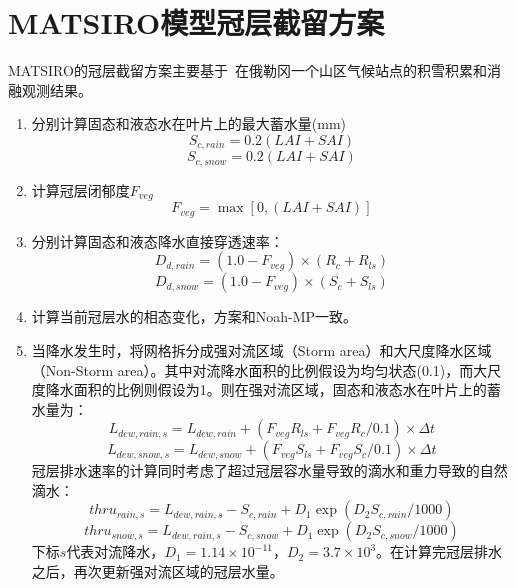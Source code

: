 \section{MATSIRO模型冠层截留方案}
MATSIRO的冠层截留方案主要基于~\cite{storck2002measurement}在俄勒冈一个山区气候站点的积雪积累和消融观测结果。
\begin{enumerate}
\item 分别计算固态和液态水在叶片上的最大蓄水量(mm)\\
\begin{equation}
S_{c,rain}=0.2\left(LAI+SAI\right)
\end{equation}
\begin{equation}
S_{c,snow}=0.2\left(LAI+SAI\right)
\end{equation}

\item 计算冠层闭郁度$F_{veg}$
\begin{equation}
F_{veg} = \max\left[0, \left(LAI+SAI\right)\right]
\end{equation}

\item 分别计算固态和液态降水直接穿透速率：
\begin{equation}
D_{d,rain}=\left(1.0-F_{veg}\right) \times (R_{c}+R_{ls})
\end{equation}
\begin{equation}
D_{d,snow}=\left(1.0-F_{veg}\right) \times (S_{c}+S_{ls})
\end{equation}
\item 计算当前冠层水的相态变化，方案和Noah-MP一致。

\item 当降水发生时，将网格拆分成强对流区域（Storm area）和大尺度降水区域（Non-Storm area）。其中对流降水面积的比例假设为均匀状态(0.1)，而大尺度降水面积的比例则假设为1。则在强对流区域，固态和液态水在叶片上的蓄水量为：
\begin{equation}
L_{dew,rain,s}=L_{dew,rain}+(F_{veg}R_{ls}+F_{veg}R_{c}/0.1)\times \Delta{t}
\end{equation}
\begin{equation}
L_{dew,snow,s}=L_{dew,snow}+(F_{veg}S_{ls}+F_{veg}S_{c}/0.1)\times \Delta{t}
\end{equation}
冠层排水速率的计算同时考虑了超过冠层容水量导致的滴水和重力导致的自然滴水：
\begin{equation}
thru_{rain,s}=L_{dew,rain,s}-S_{c,rain}+D_{1} \exp \left(D_{2} S_{c,rain}/1000\right)
\end{equation}
\begin{equation}
thru_{snow,s}=L_{dew,rain,s}-S_{c,snow}+D_{1} \exp \left(D_{2} S_{c,snow}/1000\right)
\end{equation}
下标$s$代表对流降水，$D_{1}=1.14 \times 10^{-11}$，$D_{2}=3.7 \times 10^{3}$。在计算完冠层排水之后，再次更新强对流区域的冠层水量。


\end{enumerate}
